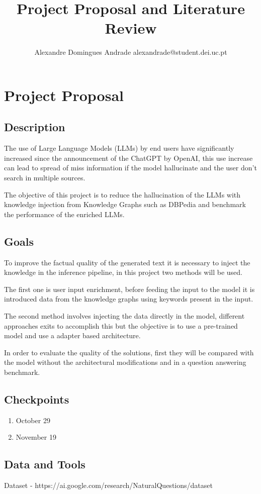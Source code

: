\documentclass{article}
\title{Project Proposal and Literature Review}
\author{
    Alexandre Domingues Andrade
    \emails
    alexandrade@student.dei.uc.pt
}
\begin{document}
\maketitle

\section{Project Proposal}

\subsection{Description}

The use of Large Language Models (LLMs) by end users have significantly increased since the announcement of the ChatGPT by OpenAI, this use increase can lead to spread of miss information if the model hallucinate and the user don't search in multiple sources.

The objective of this project is to reduce the hallucination of the LLMs with knowledge injection from Knowledge Graphs such as DBPedia and benchmark the performance of the enriched LLMs.

\subsection{Goals}

To improve the factual quality of the generated text it is necessary to inject the knowledge in the inference pipeline, in this project two methods will be used.

The first one is user input enrichment, before feeding the input to the model it is introduced data from the knowledge graphs using keywords present in the input. 

The second method involves injecting the data directly in the model, different approaches exits to accomplish this but the objective is to use a pre-trained model and use a adapter based architecture.

In order to evaluate the quality of the solutions, first they will be compared with the model without the architectural modifications and in a question answering benchmark.

\subsection{Checkpoints}

\begin{enumerate}
	\item October 29
	\item November 19
\end{enumerate}

\subsection{Data and Tools}

Dataset - https://ai.google.com/research/NaturalQuestions/dataset
\end{document}
